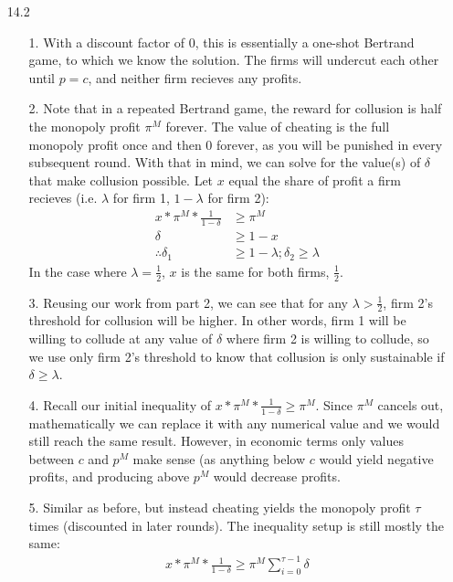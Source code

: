 \documentclass[12pt,letterpaper]{article}
\begin{document}
\begin{enumerate}
\item[14.2]
\begin{enumerate}
	\item[1.] With a discount factor of 0, this is essentially a one-shot Bertrand game, to which we know the solution. The firms will undercut each other until $p = c$, and neither firm recieves any profits.
	\item[2.] Note that in a repeated Bertrand game, the reward for collusion is half the monopoly profit $\pi^M$ forever. The value of cheating is the full monopoly profit once and then 0 forever, as you will be punished in every subsequent round. With that in mind, we can solve for the value(s) of $\delta$ that make collusion possible. Let $x$ equal the share of profit a firm recieves (i.e. $\lambda$ for firm 1, $1 - \lambda$ for firm 2):
	\begin{align*}
		x * \pi^M * \frac{1}{1-\delta} &\geq \pi^M \\
		\delta &\geq 1 - x \\
		\therefore \delta_1 &\geq 1 - \lambda; \delta_2 \geq \lambda
	\end{align*}  
	In the case where $\lambda = \frac{1}{2}$, $x$ is the same for both firms, $\frac{1}{2}$.

	\item[3.] Reusing our work from part 2, we can see that for any $\lambda > \frac{1}{2}$, firm 2's threshold for collusion will be higher. In other words, firm 1 will be willing to collude at any value of $\delta$ where firm 2 is willing to collude, so we use only firm 2's threshold to know that collusion is only sustainable if $\delta \geq \lambda$. 
	\item[4.] Recall our initial inequality of $x * \pi^M * \frac{1}{1-\delta} \geq \pi^M$. Since $\pi^M$ cancels out, mathematically we can replace it with any numerical value and we would still reach the same result. However, in economic terms only values between $c$ and $p^M$ make sense (as anything below $c$ would yield negative profits, and producing above $p^M$ would decrease profits.
	\item[5.] Similar as before, but instead cheating yields the monopoly profit $\tau$ times (discounted in later rounds). The inequality setup is still mostly the same:
	\begin{align*}
		x * \pi^M * \frac{1}{1-\delta} \geq \pi^M \sum_{i=0}^{\tau-1} \delta
	\end{align*}   
\end{enumerate} 


\end{enumerate}
	
\end{document}
